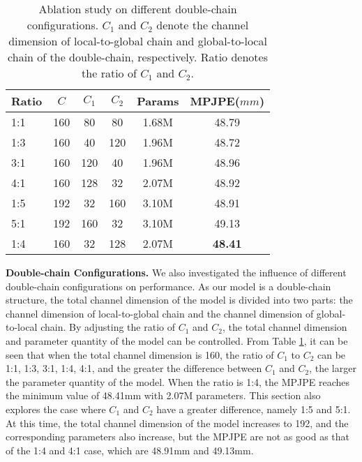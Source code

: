 \documentclass[journal]{IEEEtran}
\begin{document}
\begin{table}[ht]
  \renewcommand{\arraystretch}{1.2}
\caption{Ablation study on different double-chain configurations. $C_1$ and $C_2$ denote the channel dimension of local-to-global chain and global-to-local chain of the double-chain, respectively. Ratio denotes the ratio of $C_1$ and $C_2$.}\label{table:channel}
\centering \begin{tabular}{l|c|cc|c|c}
\toprule Ratio  &$C$ &$C_1$ &$C_2$   &Params &MPJPE($mm$)\\
\hline
1:1   &160  &80   &80        &1.68M   &48.79 \\
1:3   &160  &40   &120       &1.96M   &48.72\\
3:1   &160  &120  &40     &1.96M   &48.96 \\
4:1   &160  &128  &32     &2.07M   &48.92 \\
1:5   &192 &32   &160    &3.10M &48.91 \\
5:1   &192 &160   &32    &3.10M &49.13 \\
\hline
1:4   &160 &32   &128    &2.07M &\bf{48.41} \\
\bottomrule 

\end{tabular}
\end{table}


{\bf{Double-chain Configurations.}} We also investigated the influence of different double-chain configurations on performance. As our model is a double-chain structure, the total channel dimension of the model is divided into two parts: the channel dimension of local-to-global chain and the channel dimension of global-to-local chain. By adjusting the ratio of $C_1$ and $C_2$, the total channel dimension and parameter quantity of the model can be controlled. From Table \ref{table:channel}, it can be seen that when the total channel dimension is 160, the ratio of $C_1$ to $C_2$ can be 1:1, 1:3, 3:1, 1:4, 4:1, and the greater the difference between $C_1$ and $C_2$, the larger the parameter quantity of the model. When the ratio is 1:4, the MPJPE reaches the minimum value of 48.41mm with 2.07M parameters. This section also explores the case where $C_1$ and $C_2$ have a greater difference, namely 1:5 and 5:1. At this time, the total channel dimension of the model increases to 192, and the corresponding parameters also increase, but the MPJPE are not as good as that of the 1:4 and 4:1 case, which are 48.91mm and 49.13mm. 
\end{document}
